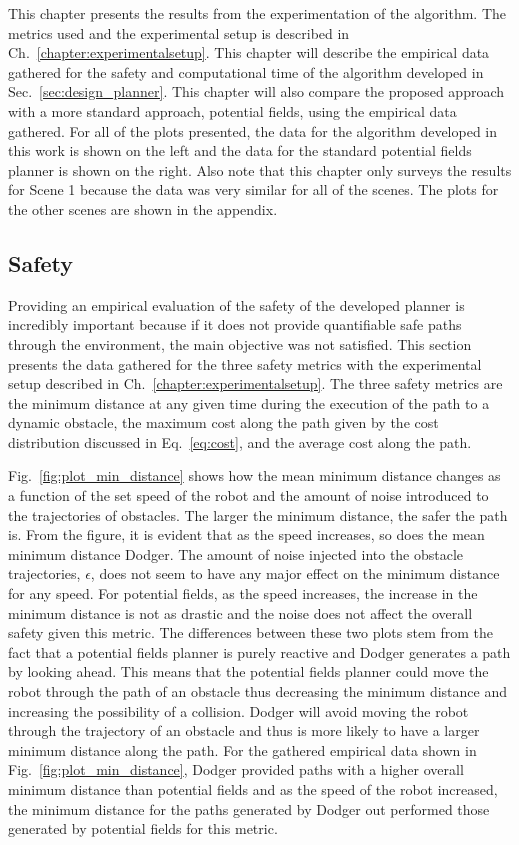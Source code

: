 \documentclass[letterpaper, 10pt, conference]{ieeeconf}
\begin{document}
This chapter presents the results from the experimentation of the algorithm.
The metrics used and the experimental setup is described in
Ch.~\ref{chapter:experimentalsetup}. This chapter will describe the empirical
data gathered for the safety and computational time of the algorithm developed
in Sec.~\ref{sec:design_planner}. This chapter will also compare the proposed
approach with a more standard approach, potential fields, using the empirical
data gathered. For all of the plots presented, the data for the algorithm
developed in this work is shown on the left and the data for the standard
potential fields planner is shown on the right. Also note that this chapter
only surveys the results for Scene 1 because the data was very similar for all
of the scenes. The plots for the other scenes are shown in the appendix.

\subsection{Safety}

Providing an empirical evaluation of the safety of the developed planner is
incredibly important because if it does not provide quantifiable safe paths
through the environment, the main objective was not satisfied. This section
presents the data gathered for the three safety metrics with the experimental
setup described in Ch.~\ref{chapter:experimentalsetup}. The three safety
metrics are the minimum distance at any given time during the execution of the
path to a dynamic obstacle, the maximum cost along the path given by the cost
distribution discussed in Eq.~\ref{eq:cost}, and the average cost along the
path.

Fig.~\ref{fig:plot_min_distance} shows how the mean minimum distance changes as
a function of the set speed of the robot and the amount of noise introduced to
the trajectories of obstacles. The larger the minimum distance, the safer the
path is. From the figure, it is evident that as the speed increases, so does
the mean minimum distance Dodger. The amount of noise injected into the
obstacle trajectories, $\epsilon$, does not seem to have any major effect on
the minimum distance for any speed. For potential fields, as the speed
increases, the increase in the minimum distance is not as drastic and the noise
does not affect the overall safety given this metric. The differences between
these two plots stem from the fact that a potential fields planner is purely
reactive and Dodger generates a path by looking ahead. This means that the
potential fields planner could move the robot through the path of an obstacle
thus decreasing the minimum distance and increasing the possibility of a
collision. Dodger will avoid moving the robot through the trajectory of an
obstacle and thus is more likely to have a larger minimum distance along the
path. For the gathered empirical data shown in
Fig.~\ref{fig:plot_min_distance}, Dodger provided paths with a higher overall
minimum distance than potential fields and as the speed of the robot increased,
the minimum distance for the paths generated by Dodger out performed those
generated by potential fields for this metric.
\end{document}
